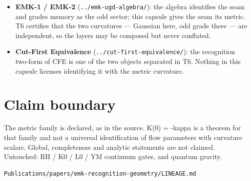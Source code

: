 \begin{itemize}
\tightlist
\item
  \textbf{EMK-1 / EMK-2} (\texttt{../emk-ugd-algebra/}): the algebra identifies the
  seam and grades memory as the odd sector; this capsule gives the seam
  its metric. T6 certifies that the two curvatures --- Gaussian here, odd
  grade there --- are independent, so the layers may be composed but never
  conflated.
\item
  \textbf{Cut-First Equivalence} (\texttt{../cut-first-equivalence/}): the
  recognition two-form of CFE is one of the two objects separated in T6.
  Nothing in this capsule licenses identifying it with the metric
  curvature.
\end{itemize}

\hypertarget{claim-boundary}{%
\section{Claim boundary}\label{claim-boundary}}

The metric family is declared, as in the source. K(0) = -kappa is a
theorem for that family and not a universal identification of flow
parameters with curvature scalars. Global, completeness and analytic
statements are not claimed. Untouched: RH / K0 / L0 / YM continuum
gates, and quantum gravity.

\begin{flushright}\small\texttt{Publications/papers/emk-recognition-geometry/LINEAGE.md}\end{flushright}
